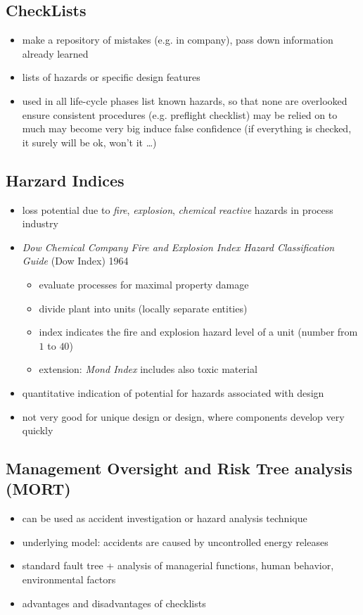 \documentclass[a4paper, 10pt]{article}
\begin{document}
\subsection*{CheckLists}
\begin{itemize}
    \item make a repository of mistakes (e.g. in company), pass down information already learned
    \item lists of hazards or specific design features
    \item used in all life-cycle phases
    \good list known hazards, so that none are overlooked
    \good ensure consistent procedures (e.g. preflight checklist)
    \bad may be relied on to much
    \bad may become very big
    \bad induce false confidence (if everything is checked, it surely will be ok, won't it \dots)
\end{itemize}

\subsection*{Harzard  Indices}
\begin{itemize}
    \item loss potential due to \emph{fire}, \emph{explosion}, \emph{chemical reactive} hazards in process industry
    \item \emph{Dow Chemical Company Fire and Explosion Index Hazard Classification Guide} {\tiny (Dow Index)} 1964
    \begin{itemize}
        \item evaluate processes for maximal property damage
        \item divide plant into units (locally separate entities)
        \item index indicates the fire and explosion hazard level of a unit (number from $1$ to $40$)
        \item extension: \emph{Mond Index} includes also toxic material
    \end{itemize}
    \item quantitative indication of potential for hazards associated with design
    \item not very good for unique design or design, where components develop very quickly
\end{itemize}

\subsection*{Management Oversight and Risk Tree analysis (MORT)}
\begin{itemize}
    \item can be used as accident investigation or hazard analysis technique
    \item underlying model: accidents are caused by uncontrolled energy releases
    \item standard fault tree + analysis of managerial functions, human behavior, environmental factors
    \item advantages and disadvantages of checklists
\end{itemize}
\end{document}
